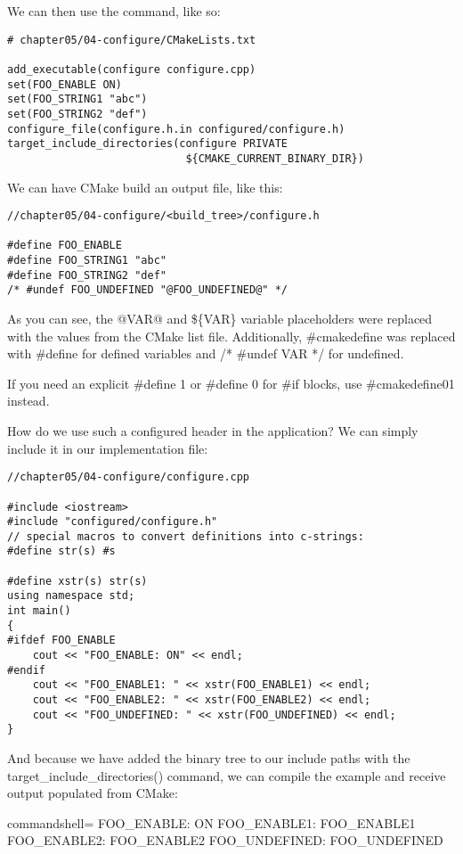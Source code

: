 We can then use the command, like so:

\begin{lstlisting}[style=styleCMake]
# chapter05/04-configure/CMakeLists.txt

add_executable(configure configure.cpp)
set(FOO_ENABLE ON)
set(FOO_STRING1 "abc")
set(FOO_STRING2 "def")
configure_file(configure.h.in configured/configure.h)
target_include_directories(configure PRIVATE
							${CMAKE_CURRENT_BINARY_DIR})
\end{lstlisting}  

We can have CMake build an output file, like this:

\begin{lstlisting}[style=styleCXX]
//chapter05/04-configure/<build_tree>/configure.h
	
#define FOO_ENABLE
#define FOO_STRING1 "abc"
#define FOO_STRING2 "def"
/* #undef FOO_UNDEFINED "@FOO_UNDEFINED@" */
\end{lstlisting}  

As you can see, the @VAR@ and \$\{VAR\} variable placeholders were replaced with the values from the CMake list file. Additionally, \#cmakedefine was replaced with \#define for defined variables and /* \#undef VAR */ for undefined.

If you need an explicit \#define 1 or \#define 0 for \#if blocks, use \#cmakedefine01 instead.

How do we use such a configured header in the application? We can simply include it in our implementation file:

\begin{lstlisting}[style=styleCXX]
//chapter05/04-configure/configure.cpp

#include <iostream>
#include "configured/configure.h"
// special macros to convert definitions into c-strings:
#define str(s) #s

#define xstr(s) str(s)
using namespace std;
int main()
{
#ifdef FOO_ENABLE
	cout << "FOO_ENABLE: ON" << endl;
#endif
	cout << "FOO_ENABLE1: " << xstr(FOO_ENABLE1) << endl;
	cout << "FOO_ENABLE2: " << xstr(FOO_ENABLE2) << endl;
	cout << "FOO_UNDEFINED: " << xstr(FOO_UNDEFINED) << endl;
}
\end{lstlisting}

And because we have added the binary tree to our include paths with the target\_include\_directories() command, we can compile the example and receive output populated from CMake:

\begin{tcblisting}{commandshell={}}
FOO_ENABLE: ON
FOO_ENABLE1: FOO_ENABLE1
FOO_ENABLE2: FOO_ENABLE2
FOO_UNDEFINED: FOO_UNDEFINED
\end{tcblisting}

